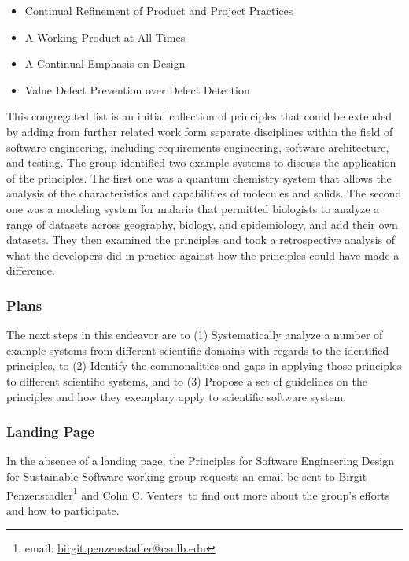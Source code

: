 \begin{itemize}
\item Continual Refinement of Product and Project Practices
\item A Working Product at All Times
\item A Continual Emphasis on Design
\item Value Defect Prevention over Defect Detection
\end{itemize}

This congregated list is an initial collection of principles that could be extended by adding from further 
related work form separate disciplines within the field of software engineering, including requirements 
engineering, software architecture, and testing. The group identified two example systems to discuss 
the application of the principles. The first one was a quantum chemistry system that allows the analysis 
of the characteristics and capabilities of molecules and solids. The second one was a modeling system 
for malaria that permitted biologists to analyze a range of datasets across geography, biology, and 
epidemiology, and add their own datasets. They then examined the principles and took a retrospective 
analysis of what the developers did in practice against how the principles could have made a 
difference.

\subsubsection{Plans}
The next steps in this endeavor are to (1) Systematically analyze a number of example systems from different scientific domains with regards to the identified principles, to (2) Identify the commonalities and gaps in applying those principles to different scientific systems, and to (3) Propose a set of guidelines on the principles and how they exemplary apply to scientific software system. 

\subsubsection{Landing Page}
In the absence of a landing page, the Principles for Software Engineering Design for Sustainable Software working group requests an email be sent to Birgit Penzenstadler\footnote{email: \href{mailto:birgit.penzenstadler@csulb.edu}{birgit.penzenstadler@csulb.edu}} and Colin C. Venters\ to find out more about the group's efforts and how to participate.
